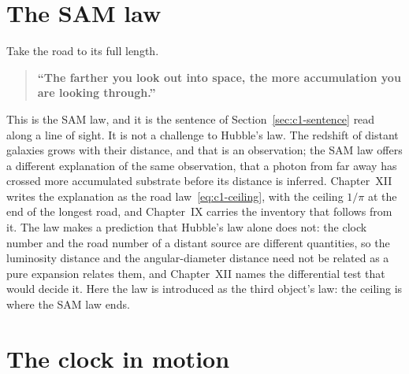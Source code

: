 \section{The SAM law}
\label{sec:c1-law}

Take the road to its full length.
\begin{quote}
\textbf{``The farther you look out into space, the more accumulation you are looking through.''}
\end{quote}
This is the SAM law, and it is the sentence of Section~\ref{sec:c1-sentence} read along a line of sight. It is not a challenge to Hubble's law. The redshift of distant galaxies grows with their distance, and that is an observation; the SAM law offers a different explanation of the same observation, that a photon from far away has crossed more accumulated substrate before its distance is inferred. Chapter~XII writes the explanation as the road law~\eqref{eq:c1-ceiling}, with the ceiling $1/\pi$ at the end of the longest road, and Chapter~IX carries the inventory that follows from it. The law makes a prediction that Hubble's law alone does not: the clock number and the road number of a distant source are different quantities, so the luminosity distance and the angular-diameter distance need not be related as a pure expansion relates them, and Chapter~XII names the differential test that would decide it. Here the law is introduced as the third object's law: the ceiling is where the SAM law ends.

\section{The clock in motion}
\label{sec:c1-motion}

